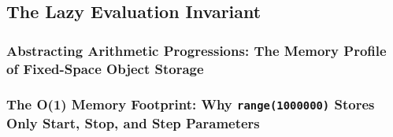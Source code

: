 \subsection{The Lazy Evaluation Invariant}
\subsubsection{Abstracting Arithmetic Progressions: The Memory Profile of Fixed-Space Object Storage}
\subsubsection{The O(1) Memory Footprint: Why \texttt{range(1000000)} Stores Only Start, Stop, and Step Parameters}
